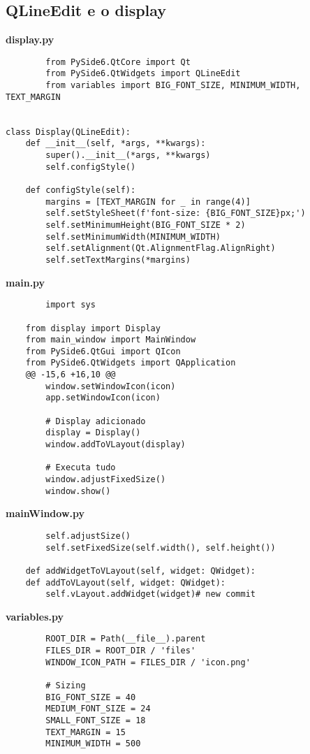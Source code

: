 \documentclass[12pt,a4paper]{article}
\begin{document}
    

    \subsection{QLineEdit e o display}
    \textbf{display.py}
    \begin{lstlisting}
        from PySide6.QtCore import Qt
        from PySide6.QtWidgets import QLineEdit
        from variables import BIG_FONT_SIZE, MINIMUM_WIDTH, TEXT_MARGIN


class Display(QLineEdit):
    def __init__(self, *args, **kwargs):
        super().__init__(*args, **kwargs)
        self.configStyle()

    def configStyle(self):
        margins = [TEXT_MARGIN for _ in range(4)]
        self.setStyleSheet(f'font-size: {BIG_FONT_SIZE}px;')
        self.setMinimumHeight(BIG_FONT_SIZE * 2)
        self.setMinimumWidth(MINIMUM_WIDTH)
        self.setAlignment(Qt.AlignmentFlag.AlignRight)
        self.setTextMargins(*margins)
    \end{lstlisting}

    \textbf{main.py}
    \begin{lstlisting}
        import sys

    from display import Display
    from main_window import MainWindow
    from PySide6.QtGui import QIcon
    from PySide6.QtWidgets import QApplication
    @@ -15,6 +16,10 @@
        window.setWindowIcon(icon)
        app.setWindowIcon(icon)
        
        # Display adicionado 
        display = Display()
        window.addToVLayout(display)

        # Executa tudo
        window.adjustFixedSize()
        window.show()
    \end{lstlisting}

    \textbf{mainWindow.py}
    \begin{lstlisting}
        self.adjustSize()
        self.setFixedSize(self.width(), self.height())

    def addWidgetToVLayout(self, widget: QWidget):
    def addToVLayout(self, widget: QWidget):
        self.vLayout.addWidget(widget)# new commit
    \end{lstlisting}
    \textbf{variables.py}
    \begin{lstlisting}
        ROOT_DIR = Path(__file__).parent
        FILES_DIR = ROOT_DIR / 'files'
        WINDOW_ICON_PATH = FILES_DIR / 'icon.png'

        # Sizing
        BIG_FONT_SIZE = 40
        MEDIUM_FONT_SIZE = 24
        SMALL_FONT_SIZE = 18
        TEXT_MARGIN = 15
        MINIMUM_WIDTH = 500
    \end{lstlisting}
\end{document}
